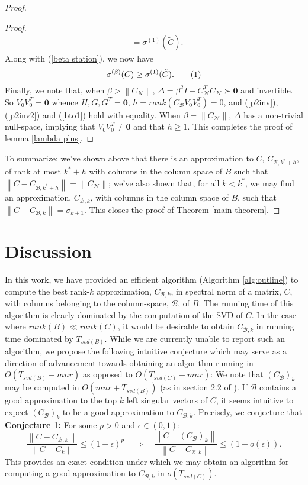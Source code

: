 \documentclass[11pt]{article}
\newcommand{\norm}[1]{\left\|#1\right\|}
\newcommand{\B}{\mathcal{B}}
\newcommand{\N}{\mathcal{N}}
\newcommand{\0}{\ensuremath{\mathbf{0}}}
\renewcommand{\>}{\succ}
\newcommand{\<}{\prec}
\newcommand\numberthis{\addtocounter{equation}{1}\tag{\theequation}}
\begin{document}
\begin{proof}
\begin{proof}
\begin{align*}
& = \sigma^{(1)}(\tilde C).
\end{align*}
Along with (\ref{beta station}), we now have
\[ \sigma^{(\beta)}(C) \geq \sigma^{(1)}(\tilde C). \numberthis \label{bto1} \]
Finally, we note that, when $\beta > \norm{C_{\N}}$, $\Delta = \beta ^2 I - C_{\N}^T C_{\N}  \> \mathbf{0}$ and invertible. So $V_0 V_0 ^T = \mathbf{0}$ whence $H, G, G^T = \mathbf{0}$, $h = rank(C_{\B} V_0 V_0 ^T) = 0$, and (\ref{p2inv}), (\ref{p2inv2}) and (\ref{bto1}) hold with equality. When $\beta = \norm{C_{\N}}$, $\Delta$ has a non-trivial null-space, implying that $V_0 V_0 ^T \neq \mathbf{0}$ and that $h \geq 1$. This completes the proof of lemma \ref{lambda plus}.
\end{proof}

\noindent To summarize: we've shown above that there is an approximation to $C$, $C_{\B, k^* + h}$, of rank at most $k^* + h$ with columns in the column space of $B$ such that $\norm{C - C_{\B, k^* + h}} = \norm{C_{\N}}$; we've also shown that, for all $k < k^*$, we may find an approximation, $C_{\B, k}$, with columns in the column space of $B$, such that $\norm{C - C_{\B, k}} = \sigma_{k+1}$. This closes the proof of Theorem \ref{main theorem}.
\end{proof}

\section{Discussion}
In this work, we have provided an efficient algorithm (Algorithm \ref{alg:outline}) to compute the best rank-$k$ approximation, $C_{\B, k}$, in spectral norm of a matrix, $C$, with columns belonging to the column-space, $\B$, of $B$. The running time of this algorithm is clearly dominated by the computation of the SVD of $C$. In the case where $rank(B) \ll rank(C)$, it would be desirable to obtain $C_{\B, k}$ in running time dominated by $T_{svd(B)}$. While we are currently unable to report such an algorithm, we propose the following intuitive conjecture which may serve as a direction of advancement towards obtaining an algorithm running in $O(T_{svd(B)} + mnr)$ as opposed to $O(T_{svd(C)} + mnr)$: We note that $(C_{\B})_k$ may be computed in $O(mnr + T_{svd(B)})$ (as in section 2.2 of \cite{BDM}). If $\B$ contains a good approximation to the top $k$ left singular vectors of $C$, it seems intuitive to expect $(C_{\B})_k$ to be a good approximation to $C_{\B, k}$. Precisely, we conjecture that\\
\textbf{Conjecture 1:} For some $p > 0$ and $\epsilon \in (0, 1)$:\\
\[ \frac{\norm{{C} - C_{\B, k}}}{\norm{C - C_k}} \leq (1+\epsilon)^p \quad \Rightarrow \quad
\frac{\norm{{C} - (C_{\B})_k} }{\norm{C - C_{\B, k}}}\leq (1+o(\epsilon)). \]
This provides an exact condition under which we may obtain an algorithm for computing a good approximation to $C_{\B, k}$ in $o(T_{svd(C)})$.\\
\end{document}
